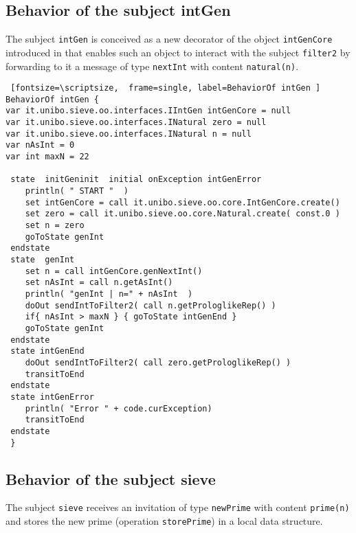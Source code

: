 \documentclass{../llncs}
\begin{document}
\subsection{Behavior of the subject intGen}

The subject \texttt{intGen} is conceived as a new decorator of the object \texttt{intGenCore} introduced in   that enables such an object to interact with the subject \texttt{filter2} by forwarding to it a message of type \texttt{nextInt} with content \texttt{natural(n)}.  

\begin{Verbatim} [fontsize=\scriptsize,  frame=single, label=BehaviorOf intGen ] 
BehaviorOf intGen { 
var it.unibo.sieve.oo.interfaces.IIntGen intGenCore = null 
var it.unibo.sieve.oo.interfaces.INatural zero = null
var it.unibo.sieve.oo.interfaces.INatural n = null
var nAsInt = 0
var int maxN = 22
  	
 state  initGeninit  initial onException intGenError
	println( " START " 	)     
	set intGenCore = call it.unibo.sieve.oo.core.IntGenCore.create()
	set zero = call it.unibo.sieve.oo.core.Natural.create( const.0 )  
	set n = zero
	goToState genInt
 endstate 	 	   
 state  genInt  
	set n = call intGenCore.genNextInt()  
	set nAsInt = call n.getAsInt()
	println( "genInt | n=" + nAsInt  )
	doOut sendIntToFilter2( call n.getProloglikeRep() )		
	if{ nAsInt > maxN } { goToState intGenEnd }   
	goToState genInt  
 endstate 		
 state intGenEnd
	doOut sendIntToFilter2( call zero.getProloglikeRep() )
	transitToEnd
 endstate
 state intGenError
 	println( "Error " + code.curException)
	transitToEnd
 endstate
 }
\end{Verbatim}

\subsection{Behavior of the subject sieve}
The subject \texttt{sieve} receives an invitation of type \texttt{newPrime} with content \texttt{prime(n)} and stores the new prime (operation \texttt{storePrime}) in a local data structure.
\end{document}
